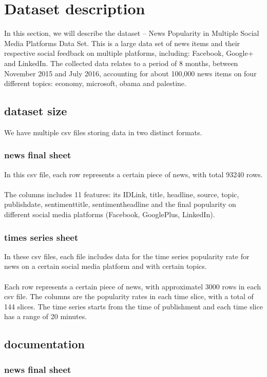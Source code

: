 \documentclass[10pt]{article}
\begin{document}
\section{Dataset description}
In this section, we will describe the dataset -- News Popularity in Multiple 
Social Media Platforms Data Set. This is a large data set of news items and 
their respective social feedback on multiple platforms, including: Facebook, 
Google+ and LinkedIn. The collected data relates to a period of 8 months, 
between November 2015 and July 2016, accounting for about 100,000 news items 
on four different topics: economy, microsoft, obama and palestine.

\subsection{dataset size}
We have multiple csv files storing data in two distinct formats.

\subsubsection{news final sheet}
In this csv file, each row represents a certain piece of news, with total 93240 
rows.\\\\ The columns includes 11 features: its IDLink, title, headline, source, 
topic, publishdate, sentimenttitle, sentimentheadline and the final popularity 
on different social media platforms (Facebook, GooglePlus, LinkedIn).

\subsubsection{times series sheet}
In these csv files, each file includes data for the time series popularity rate 
for news on a certain social media platform and with certain topics.\\\\
Each row represents a certain piece of news, with approximatel 3000 rows in each 
csv file. The columns are the popularity rates in each time slice, with a total of 
144 slices. The time series starts from the time of publishment and each time slice 
has a range of 20 minutes.

\subsection{documentation}

\subsubsection{news final sheet}
\end{document}
